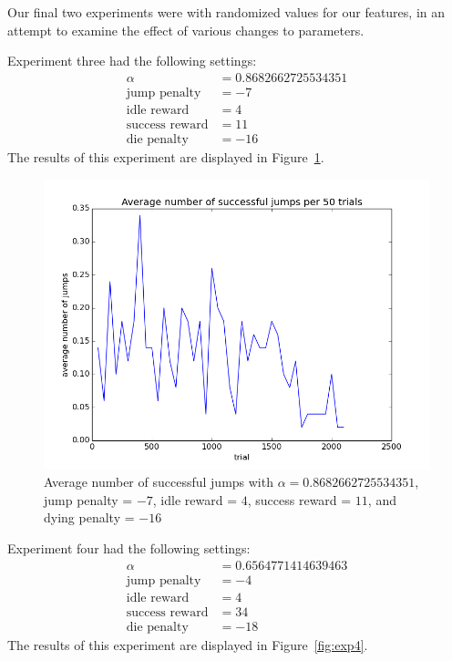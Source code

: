\documentclass{scrartcl}
\begin{document}
    Our final two experiments were with randomized values for our features, in
    an attempt to examine the effect of various changes to parameters.

    Experiment three had the following settings:
    \begin{align*}
        \alpha &= 0.8682662725534351\\
        \text{jump penalty} &= -7\\
        \text{idle reward} &= 4\\
        \text{success reward} &= 11\\
        \text{die penalty} & = -16
    \end{align*}
    The results of this experiment are displayed in Figure~\ref{fig:exp3}.

    \begin{figure}[H]
        \includegraphics[width=\textwidth]{../avgJumps3}
        \caption{Average number of successful jumps with $\alpha =
        0.8682662725534351$, jump penalty = $-7$, idle reward = $4$, success
        reward = $11$, and dying penalty = $-16$}
        \label{fig:exp3}
    \end{figure}

    Experiment four had the following settings:
    \begin{align*}
        \alpha &= 0.6564771414639463\\
        \text{jump penalty} &= -4\\
        \text{idle reward} &= 4\\
        \text{success reward} &= 34\\
        \text{die penalty} & = -18
    \end{align*}
    The results of this experiment are displayed in Figure~\ref{fig:exp4}.
\end{document}

